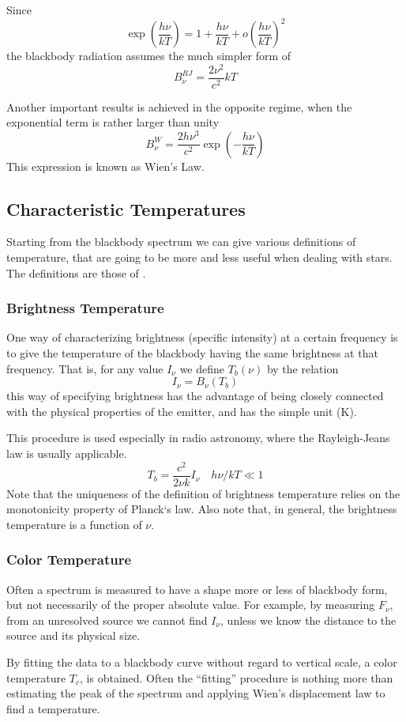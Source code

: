 \par Since 
\begin{equation*}
	\exp\left(\frac{h\nu}{kT}\right) = 1+\frac{h\nu}{kT}+o\left(\frac{h\nu}{kT}\right)^{2}
\end{equation*} 
the blackbody radiation assumes the much simpler form of
\begin{equation*}
	B_{\nu}^{RJ} = \frac{2\nu^{2}}{c^{2}}kT
\end{equation*}
\par Another important results is achieved in the opposite regime, when the exponential term is rather larger than unity
\begin{equation*}
	B_{\nu}^{W} = \frac{2h\nu^{3}}{c^{2}}\exp\left(-\frac{h\nu}{kT}\right)
\end{equation*}
This expression is known as Wien's Law.
\subsection*{Characteristic Temperatures}
Starting from the blackbody spectrum we can give various definitions of temperature, that are going to be more and less useful when dealing with stars. The definitions are those of \cite{1986rpa..book.....R}.
\subsubsection*{Brightness Temperature}
One way of characterizing brightness (specific intensity) at a certain frequency is to give the temperature of the blackbody having the same brightness at that frequency. That is, for any value $I_{\nu}$ we define $T_{b}(\nu)$ by the relation
\begin{equation*}
    I_{\nu} = B_{\nu}(T_{b})   
\end{equation*}
this way of specifying brightness has the advantage of being closely connected with the physical properties of the emitter, and has the simple unit (K).
\par This procedure is used especially in radio astronomy, where the Rayleigh-Jeans law is usually applicable.
\begin{equation}
    T_{b} = \frac{c^{2}}{2\nu k}I_{\nu} \quad h\nu/kT \ll 1
\end{equation}
Note that the uniqueness of the definition of brightness temperature relies on the monotonicity property of Planck‘s law. Also note that, in general, the brightness temperature is a function of $\nu$.
\subsubsection*{Color Temperature}
Often a spectrum is measured to have a shape more or less of blackbody form, but not necessarily of the proper absolute value. For example, by measuring $F_{\nu}$, from an unresolved source we cannot find $I_{\nu}$, unless we know the distance to the source and its physical size.
\par By fitting the data to a blackbody curve without regard to vertical scale, a color temperature $T_{c}$, is obtained. Often the “fitting” procedure is nothing more than estimating the peak of the spectrum and applying Wien’s displacement law to find a temperature.
